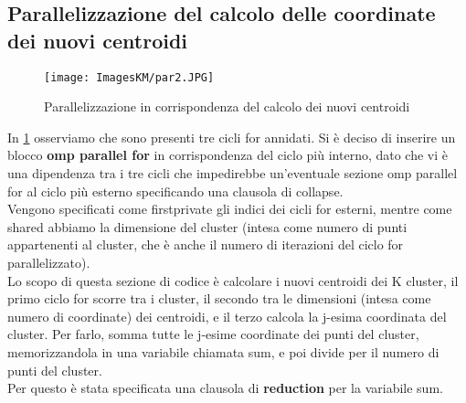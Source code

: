 \documentclass[10pt,twocolumn,letterpaper]{article}
\begin{document}
\subsection{Parallelizzazione del calcolo delle coordinate dei nuovi centroidi}
\begin{figure}[h]
    \centering
    \texttt{[image: ImagesKM/par2.JPG]}
    \caption{Parallelizzazione in corrispondenza del calcolo dei nuovi centroidi}
    \label{fig:p2}
\end{figure}
In \cref{fig:p2} osserviamo che sono presenti tre cicli for annidati. Si è deciso di inserire un blocco \textbf{omp parallel for} in corrispondenza del ciclo più interno, dato che vi è una dipendenza tra i tre cicli che impedirebbe un'eventuale sezione omp parallel for al ciclo più esterno specificando una clausola di collapse.\\
Vengono specificati come firstprivate gli indici dei cicli for esterni, mentre come shared abbiamo la dimensione del cluster (intesa come numero di punti appartenenti al cluster, che è anche il numero di iterazioni del ciclo for parallelizzato).\\
Lo scopo di questa sezione di codice è calcolare i nuovi centroidi dei K cluster, il primo ciclo for scorre tra i cluster, il secondo tra le dimensioni (intesa come numero di coordinate) dei centroidi, e il terzo calcola la j-esima coordinata del cluster. Per farlo, somma tutte le j-esime coordinate dei punti del cluster, memorizzandola in una variabile chiamata sum, e poi divide per il numero di punti del cluster.\\
Per questo è stata specificata una clausola di \textbf{reduction} per la variabile sum.
\end{document}
